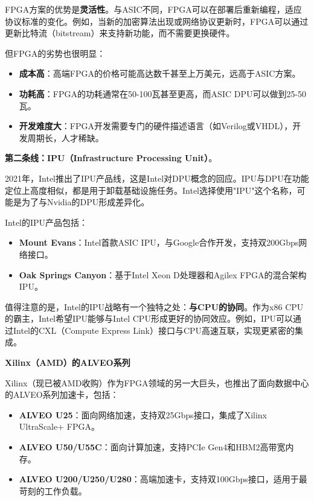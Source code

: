 FPGA方案的优势是\textbf{灵活性}。与ASIC不同，FPGA可以在部署后重新编程，适应协议标准的变化。例如，当新的加密算法出现或网络协议更新时，FPGA可以通过更新比特流（bitstream）来支持新功能，而不需要更换硬件。

但FPGA的劣势也很明显：

\begin{itemize}
    \item \textbf{成本高}：高端FPGA的价格可能高达数千甚至上万美元，远高于ASIC方案。
    \item \textbf{功耗高}：FPGA的功耗通常在50-100瓦甚至更高，而ASIC DPU可以做到25-50瓦。
    \item \textbf{开发难度大}：FPGA开发需要专门的硬件描述语言（如Verilog或VHDL），开发周期长，人才稀缺。
\end{itemize}

\textbf{第二条线：IPU（Infrastructure Processing Unit）}。

2021年，Intel推出了IPU产品线，这是Intel对DPU概念的回应。IPU与DPU在功能定位上高度相似，都是用于卸载基础设施任务。Intel选择使用"IPU"这个名称，可能是为了与Nvidia的DPU形成差异化。

Intel的IPU产品包括：

\begin{itemize}
    \item \textbf{Mount Evans}：Intel首款ASIC IPU，与Google合作开发，支持双200Gbps网络接口。
    \item \textbf{Oak Springs Canyon}：基于Intel Xeon D处理器和Agilex FPGA的混合架构IPU。
\end{itemize}

值得注意的是，Intel的IPU战略有一个独特之处：\textbf{与CPU的协同}。作为x86 CPU的霸主，Intel希望IPU能够与Intel CPU形成更好的协同效应。例如，IPU可以通过Intel的CXL（Compute Express Link）接口与CPU高速互联，实现更紧密的集成。

\textbf{Xilinx（AMD）的ALVEO系列}

Xilinx（现已被AMD收购）作为FPGA领域的另一大巨头，也推出了面向数据中心的ALVEO系列加速卡，包括：

\begin{itemize}
    \item \textbf{ALVEO U25}：面向网络加速，支持双25Gbps接口，集成了Xilinx UltraScale+ FPGA。
    \item \textbf{ALVEO U50/U55C}：面向计算加速，支持PCIe Gen4和HBM2高带宽内存。
    \item \textbf{ALVEO U200/U250/U280}：高端加速卡，支持双100Gbps接口，适用于最苛刻的工作负载。
\end{itemize}

